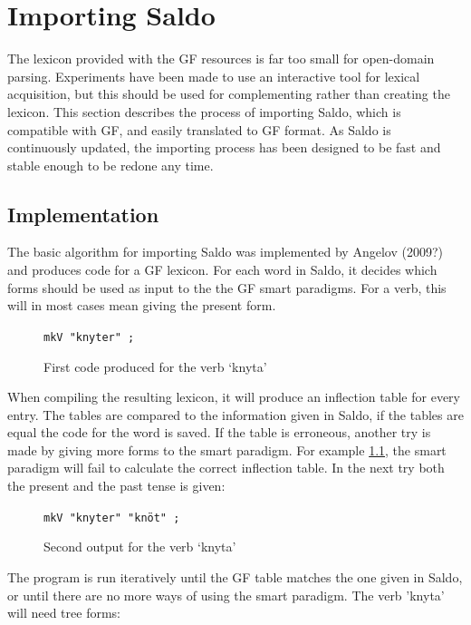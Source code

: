 \documentclass{report}
\begin{document}
\chapter{Importing Saldo}
\label{sec:prog.saldo}
The lexicon provided with the GF resources is far too small for open-domain parsing.
Experiments have been made to use an interactive tool for lexical acquisition,
but this should be used for complementing rather than creating the lexicon.
This section describes the process of importing Saldo, which is 
compatible with GF, and easily translated to GF format.
As Saldo is continuously updated, the importing process has been designed to be fast
and stable enough to be redone any time.

\section{Implementation}
The basic algorithm for importing Saldo was implemented by Angelov (2009?)
and  produces code for a GF lexicon.
For each word in Saldo, it decides which forms should be used as input
to the the GF smart paradigms. For a verb, this will in most cases mean giving
the present form. \\

\begin{figure}[h]
\verb-mkV "knyter" ;-
\caption{First code produced for the verb `knyta'}
\label{fig:saldoknyt}
\end{figure}

When compiling the resulting lexicon, it will produce an inflection table
for every entry. The tables are compared to the information given
in Saldo, if the tables are equal the code for the word is saved. If the table
is erroneous, another try is made
by giving more forms to the smart paradigm.
For example \ref{fig:saldoknyt}, the smart paradigm will fail to calculate the
correct inflection table. In the next try both the present and the past tense
is given:\\

\begin{figure}[h]
\verb-mkV "knyter" "knöt" ;-
\caption{Second output for the verb `knyta'}
\label{fig:saldoknyt2}
\end{figure}
The program is run iteratively until the GF table matches the one given in Saldo,
or until there are no more ways of using the smart paradigm. The verb 'knyta'
will need tree forms:\\
\end{document}
